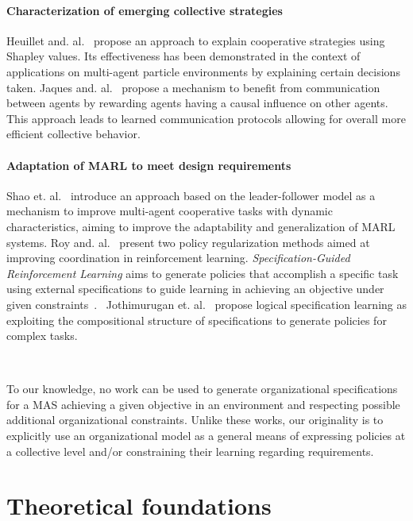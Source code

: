 \documentclass[doubleblind]{ecai}
\begin{document}
\paragraph{\textbf{Characterization of emerging collective strategies}}
%
Heuillet and. al.~\citep{Heuillet2022} propose an approach to explain cooperative strategies using Shapley values. Its effectiveness has been demonstrated in the context of applications on multi-agent particle environments by explaining certain decisions taken.
%
Jaques and. al.~\citep{Jaques2019} propose a mechanism to benefit from communication between agents by rewarding agents having a causal influence on other agents. This approach leads to learned communication protocols allowing for overall more efficient collective behavior.

\paragraph{\textbf{Adaptation of MARL to meet design requirements}}
%
Shao et. al.~\citep{Shao2022} introduce an approach based on the leader-follower model as a mechanism to improve multi-agent cooperative tasks with dynamic characteristics, aiming to improve the adaptability and generalization of MARL systems.
%
Roy and. al.~\citep{Roy2020} present two policy regularization methods aimed at improving coordination in reinforcement learning.
\emph{Specification-Guided Reinforcement Learning} aims to generate policies that accomplish a specific task using external specifications to guide learning in achieving an objective under given constraints~\citep{Bansal2022}.%
%
~Jothimurugan et. al.~\citep{Jothimurugan2021} propose logical specification learning as exploiting the compositional structure of specifications to generate policies for complex tasks.

\

To our knowledge, no work can be used to generate organizational specifications for a MAS achieving a given objective in an environment and respecting possible additional organizational constraints.
Unlike these works, our originality is to explicitly use an organizational model as a general means of expressing policies at a collective level and/or constraining their learning regarding requirements.

\section{Theoretical foundations}
\end{document}
